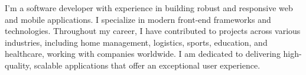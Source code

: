 \documentclass[letter,10pt]{article}
\begin{document}
\begin{justify}

I'm a software developer with experience in building robust and responsive web and mobile applications. I specialize in modern front-end frameworks and technologies. Throughout my career, I have contributed to projects across various industries, including home management, logistics, sports, education, and healthcare, working with companies worldwide. I am dedicated to delivering high-quality, scalable applications that offer an exceptional user experience.

\end{justify}
\end{document}
